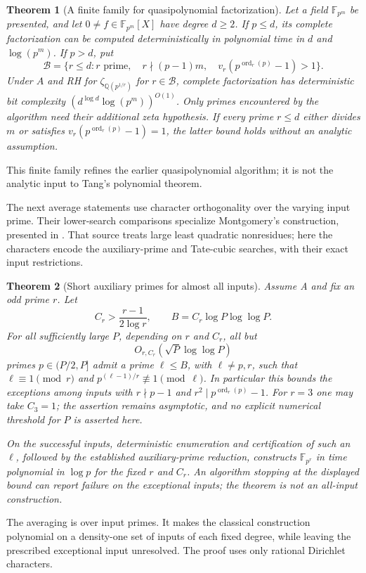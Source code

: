 \documentclass[11pt]{article}
\newcommand{\Q}{\mathbb Q}
\newcommand{\F}{\mathbb F}
\newcommand{\ord}{\operatorname{ord}}
\newtheorem{theorem}{Theorem}[section]
\theoremstyle{definition}
\theoremstyle{remark}
\begin{document}
\begin{theorem}[A finite family for quasipolynomial factorization]
\label{thm:quasipoly}
Let a field $\F_{p^m}$ be presented, and let
$0\ne f\in\F_{p^m}[X]$ have degree $d\geq2$.
If $p\leq d$, its complete factorization can be
computed deterministically in polynomial time in
$d$ and $\log(p^m)$.  If $p>d$, put
\[
 \mathcal B=\{r\leq d: r\text{ prime},\quad
 r\nmid(p-1)m,\quad v_r(p^{\ord_r(p)}-1)>1\}.
\]
Under $A$ and RH for $\zeta_{\Q(p^{1/r})}$ for
$r\in\mathcal B$, complete factorization has
deterministic bit complexity
$(d^{\log d}\log(p^m))^{O(1)}$.
Only primes encountered by the algorithm need their
additional zeta hypothesis.  If every prime $r\leq d$
either divides $m$ or satisfies
$v_r(p^{\ord_r(p)}-1)=1$, the latter bound holds
without an analytic assumption.
\end{theorem}

This finite family refines the earlier quasipolynomial algorithm; it is
not the analytic input to Tang's polynomial theorem.

The next average statements use character orthogonality over the varying input prime. Their lower-search comparisons specialize Montgomery's construction, presented in \citet[p.~432, Exercise~9(a)--(e)]{MontgomeryVaughan2007}. That source treats large least quadratic nonresidues; here the characters encode the auxiliary-prime and Tate-cubic searches, with their exact input restrictions.

\begin{theorem}[Short auxiliary primes for almost all inputs]\label{thm:fixed-r-almost-all-auxiliary}
Assume A and fix an odd prime $r$.  Let
\[
 C_r>\frac{r-1}{2\log r},\qquad
 B=C_r\log P\log\log P.
\]
For all sufficiently large $P$, depending on $r$ and $C_r$, all but
\[
 O_{r,C_r}\!\left(\sqrt P\log\log P\right)
\]
primes $p\in(P/2,P]$ admit a prime $\ell\le B$, with $\ell\ne p,r$, such that $\ell\equiv1\pmod r$ and $p^{(\ell-1)/r}\not\equiv1\pmod\ell$.
In particular this bounds the exceptions among inputs with $r\nmid p-1$ and $r^2\mid p^{\operatorname{ord}_r(p)}-1$.
For $r=3$ one may take $C_3=1$; the assertion remains asymptotic,
and no explicit numerical threshold for $P$ is asserted here.

On the successful inputs, deterministic enumeration and certification
of such an $\ell$, followed by the established auxiliary-prime
reduction, constructs $\mathbb F_{p^r}$ in time polynomial in
$\log p$ for the fixed $r$ and $C_r$.  An algorithm stopping at the displayed bound
can report failure on the exceptional inputs; the theorem is not an
all-input construction.
\end{theorem}
The averaging is over input primes. It makes the classical construction polynomial on a density-one set of inputs of each fixed degree, while leaving the prescribed exceptional input unresolved. The proof uses only rational Dirichlet characters.
\end{document}
